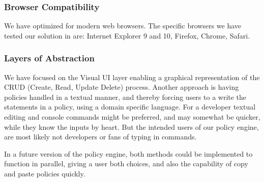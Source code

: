\subsubsection{Browser Compatibility}
We have optimized for modern web browsers. The specific browsers we have tested our solution in are: Internet Explorer 9 and 10, Firefox, Chrome, Safari. 

\subsubsection{Layers of Abstraction}
We have focused on the Visual UI layer enabling a graphical representation of the CRUD (Create, Read, Update Delete) process. Another approach is having policies handled in a textual manner, and thereby forcing users to a write the statements in a policy, using a domain specific language. For a developer textual editing and console commands might be preferred, and may somewhat be quicker, while they know the inputs by heart. But the intended users of our policy engine, are most likely not developers or fans of typing in commands.

In a future version of the policy engine, both methods could be implemented to function in parallel, giving a user both choices, and also the capability of copy and paste policies quickly.